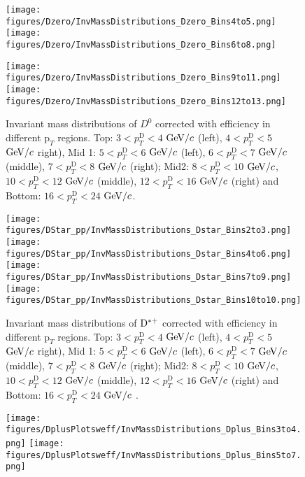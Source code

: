 \begin{figure}[!htp]
\centering
{\texttt{[image: figures/Dzero/InvMassDistributions\_Dzero\_Bins4to5.png]}}
{\texttt{[image: figures/Dzero/InvMassDistributions\_Dzero\_Bins6to8.png]}}
\end{figure}
\begin{figure}[!htp]
\centering
{\texttt{[image: figures/Dzero/InvMassDistributions\_Dzero\_Bins9to11.png]}}
{\texttt{[image: figures/Dzero/InvMassDistributions\_Dzero\_Bins12to13.png]}}

\caption{Invariant mass distributions of $D^0$ corrected with efficiency in different $\text{p}_T$ regions. Top: $3< p_{T}^{\text{D}}< 4$ $\mathrm{GeV}/c$ (left), $4< p_{T}^{\text{D}}< 5$ $\mathrm{GeV}/c$ right), Mid 1: $5< p_{T}^{\text{D}}< 6$ $\mathrm{GeV}/c$ (left), $6 < p_{T}^{\text{D}} < 7$ $\mathrm{GeV}/c$ (middle), $7< p_{T}^{\text{D}}< 8$ $\mathrm{GeV}/c$ (right); Mid2: $8< p_{T}^{\text{D}}< 10$ $\mathrm{GeV}/c$, $10< p_{T}^{\text{D}}< 12$ $\mathrm{GeV}/c$  (middle), $12 < p_{T}^{\text{D}}< 16$ $\mathrm{GeV}/c$  (right) and Bottom: $16<p_{T}^{\text{D}}< 24$ $\mathrm{GeV}/c$.}
\label{fig:InvMassD0}
\end{figure}

\begin{figure}[!htp]
\centering
{\texttt{[image: figures/DStar\_pp/InvMassDistributions\_Dstar\_Bins2to3.png]}}
{\texttt{[image: figures/DStar\_pp/InvMassDistributions\_Dstar\_Bins4to6.png]}}
{\texttt{[image: figures/DStar\_pp/InvMassDistributions\_Dstar\_Bins7to9.png]}}
{\texttt{[image: figures/DStar\_pp/InvMassDistributions\_Dstar\_Bins10to10.png]}}

\caption{Invariant mass distributions of ${\rm D^{*+}}$ corrected with efficiency in different $\text{p}_T$ regions. Top: $3< p_{T}^{\text{D}}< 4$ $\mathrm{GeV}/c$ (left), $4< p_{T}^{\text{D}}< 5$ $\mathrm{GeV}/c$ right), Mid 1: $5< p_{T}^{\text{D}}< 6$ $\mathrm{GeV}/c$ (left), $6 < p_{T}^{\text{D}} < 7$ $\mathrm{GeV}/c$ (middle), $7< p_{T}^{\text{D}}< 8$ $\mathrm{GeV}/c$ (right); Mid2: $8< p_{T}^{\text{D}}< 10$ $\mathrm{GeV}/c$, $10< p_{T}^{\text{D}}< 12$ $\mathrm{GeV}/c$  (middle), $12 < p_{T}^{\text{D}}< 16$ $\mathrm{GeV}/c$  (right) and Bottom: $16<p_{T}^{\text{D}}< 24$ $\mathrm{GeV}/c$ .}
\label{fig:InvMassDs}
\end{figure}

\begin{figure}[h]
\centering
{\texttt{[image: figures/DplusPlotsweff/InvMassDistributions\_Dplus\_Bins3to4.png]}}
{\texttt{[image: figures/DplusPlotsweff/InvMassDistributions\_Dplus\_Bins5to7.png]}}
\end{figure}

